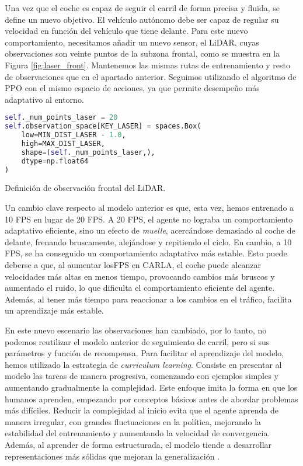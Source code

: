 Una vez que el coche es capaz de seguir el carril de forma precisa y fluida, se define un nuevo objetivo. El vehículo autónomo debe ser capaz de regular su velocidad en función del vehículo que tiene delante. Para este nuevo comportamiento, necesitamos añadir un nuevo sensor, el \ac{LiDAR}, cuyas observaciones son veinte puntos de la subzona frontal, como se muestra en la Figura \ref{fig:laser_front}. Mantenemos las mismas rutas de entrenamiento y resto de observaciones que en el apartado anterior. Seguimos utilizando el algoritmo de \ac{PPO} con el mismo espacio de acciones, ya que permite desempeño más adaptativo al entorno.

\begin{code}[h]
\begin{lstlisting}[language=Python]
self._num_points_laser = 20
self.observation_space[KEY_LASER] = spaces.Box(
	low=MIN_DIST_LASER - 1.0,
	high=MAX_DIST_LASER,
	shape=(self._num_points_laser,),
	dtype=np.float64
)
\end{lstlisting}
\caption[Definición de observación frontal del \ac{LiDAR}]{Definición de observación frontal del \ac{LiDAR}.}
\label{cod:obs_laser_front}
\end{code}

Un cambio clave respecto al modelo anterior es que, esta vez, hemos entrenado a 10 \ac{FPS} en lugar de 20 \ac{FPS}. A 20 \ac{FPS}, el agente no lograba un comportamiento adaptativo eficiente, sino un efecto de \textit{muelle}, acercándose demasiado al coche de delante, frenando bruscamente, alejándose y repitiendo el ciclo. En cambio, a 10 \ac{FPS}, se ha conseguido un comportamiento adaptativo más estable. Esto puede deberse a que, al aumentar los\ac{FPS} en CARLA, el coche puede alcanzar velocidades más altas en menos tiempo, provocando cambios más bruscos y aumentado el ruido, lo que dificulta el comportamiento eficiente del agente. Además, al tener más tiempo para reaccionar a los cambios en el tráfico, facilita un aprendizaje más estable.

En este nuevo escenario las observaciones han cambiado, por lo tanto, no podemos reutilizar el modelo anterior de seguimiento de carril, pero si sus parámetros y función de recompensa. Para facilitar el aprendizaje del modelo, hemos utilizado la estrategia de \textit{curriculum learning}. Consiste en presentar al modelo las tareas de manera progresiva, comenzando con ejemplos simples y aumentando gradualmente la complejidad. Este enfoque imita la forma en que los humanos aprenden, empezando por conceptos básicos antes de abordar problemas más difíciles. Reducir la complejidad al inicio evita que el agente aprenda de manera irregular, con grandes fluctuaciones en la política, mejorando la estabilidad del entrenamiento y aumentando la velocidad de convergencia. Además, al aprender de forma estructurada, el modelo tiende a desarrollar representaciones más sólidas que mejoran la generalización \cite{curriculum-learning}.

